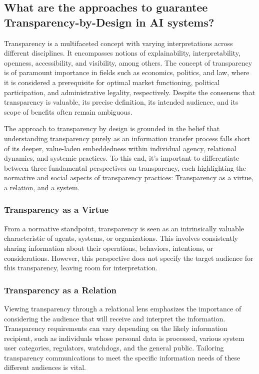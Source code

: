 \documentclass{article}
\begin{document}
\subsection{What are the approaches to guarantee Transparency-by-Design in AI systems?}
Transparency is a multifaceted concept with varying interpretations across different disciplines.\cite{articletbd} It encompasses notions of explainability, interpretability, openness, accessibility, and visibility, among others. The concept of transparency is of paramount importance in fields such as economics, politics, and law, where it is considered a prerequisite for optimal market functioning, political participation, and administrative legality, respectively. Despite the consensus that transparency is valuable, its precise definition, its intended audience, and its scope of benefits often remain ambiguous.

The approach to transparency by design is grounded in the belief that understanding transparency purely as an information transfer process falls short of its deeper, value-laden embeddedness within individual agency, relational dynamics, and systemic practices. To this end, it's important to differentiate between three fundamental perspectives on transparency, each highlighting the normative and social aspects of transparency practices: Transparency as a virtue, a relation, and a system.

\subsubsection{Transparency as a Virtue}

From a normative standpoint, transparency is seen as an intrinsically valuable characteristic of agents, systems, or organizations. This involves consistently sharing information about their operations, behaviors, intentions, or considerations. However, this perspective does not specify the target audience for this transparency, leaving room for interpretation.

\subsubsection{Transparency as a Relation}

Viewing transparency through a relational lens emphasizes the importance of considering the audience that will receive and interpret the information. Transparency requirements can vary depending on the likely information recipient, such as individuals whose personal data is processed, various system user categories, regulators, watchdogs, and the general public. Tailoring transparency communications to meet the specific information needs of these different audiences is vital.
\end{document}
